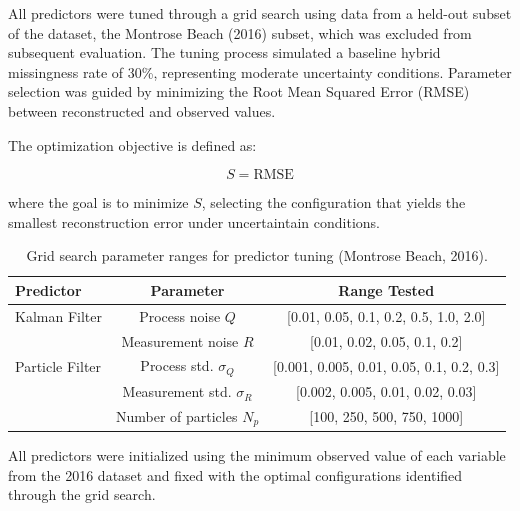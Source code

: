 All predictors were tuned through a grid search using data from a held-out subset of the dataset, the Montrose Beach (2016) subset, which was excluded from subsequent evaluation. 
The tuning process simulated a baseline hybrid missingness rate of 30\%, representing moderate uncertainty conditions. 
Parameter selection was guided by minimizing the Root Mean Squared Error (RMSE) between reconstructed and observed values.

The optimization objective is defined as:

\begin{equation}
\label{eq:gridsearch_score}
S = \mathrm{RMSE}
\end{equation}

where the goal is to minimize \( S \), selecting the configuration that yields the smallest reconstruction error under uncertaintain conditions.




\begin{table}[H]
\centering
\caption{Grid search parameter ranges for predictor tuning (Montrose Beach, 2016).}
\label{tab:predictor_params}
\begin{tabular}{lcc}
\toprule
\textbf{Predictor} & \textbf{Parameter} & \textbf{Range Tested} \\
\midrule
Kalman Filter & Process noise \(Q\) & [0.01, 0.05, 0.1, 0.2, 0.5, 1.0, 2.0] \\
              & Measurement noise \(R\) & [0.01, 0.02, 0.05, 0.1, 0.2] \\
\midrule
Particle Filter & Process std. \(\sigma_Q\) & [0.001, 0.005, 0.01, 0.05, 0.1, 0.2, 0.3] \\
                & Measurement std. \(\sigma_R\) & [0.002, 0.005, 0.01, 0.02, 0.03] \\
                & Number of particles \(N_p\) & [100, 250, 500, 750, 1000] \\
\bottomrule
\end{tabular}
\end{table}



All predictors were initialized using the minimum observed value of each variable from the 2016 dataset and fixed with the optimal configurations identified through the grid search.  










